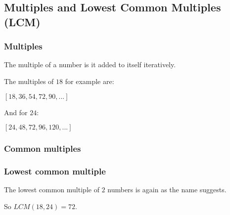 
\subsection{Multiples and Lowest Common Multiples (LCM)}

\subsubsection{Multiples}

The multiple of a number is it added to itself iteratively.

The multiples of \(18\) for example are:

$[18,36,54,72,90,...]$

And for \(24\):

$[24,48,72,96,120,...]$

\subsubsection{Common multiples}

\subsubsection{Lowest common multiple}

The lowest common multiple of \(2\) numbers is again as the name suggests.

So \(LCM(18,24)=72\).
	
